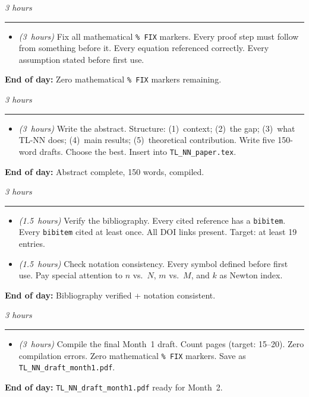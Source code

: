 \documentclass[12pt,a4paper]{article}
\newcommand{\hrs}[1]{\textit{\color{darkgray}(#1~hours)}}
\newcommand{\dayheading}[2]{%
  \vspace{0.3em}
  \noindent{\bfseries\color{darkblue}Day~#1}%
  \hfill{\small\color{darkgray}\textit{#2}}%
  \\[-0.4em]{\color{midgray}\rule{\linewidth}{0.4pt}}%
  \vspace{0.1em}
}
\begin{document}
\begin{tcolorbox}[daystyle]
\dayheading{25}{3 hours}
\begin{itemize}[leftmargin=1.8em,itemsep=3pt]
  \item[\color{midblue}$\bullet$]
    \hrs{3} Fix all mathematical \texttt{\%~FIX} markers.
    Every proof step must follow from something before it.
    Every equation referenced correctly.
    Every assumption stated before first use.
\end{itemize}
\noindent\textbf{End of day:}
Zero mathematical \texttt{\%~FIX} markers remaining.
\end{tcolorbox}

\begin{tcolorbox}[daystyle]
\dayheading{26}{3 hours}
\begin{itemize}[leftmargin=1.8em,itemsep=3pt]
  \item[\color{midblue}$\bullet$]
    \hrs{3} Write the abstract. Structure: (1)~context;
    (2)~the gap; (3)~what TL-NN does; (4)~main results;
    (5)~theoretical contribution. Write five 150-word
    drafts. Choose the best. Insert into
    \texttt{TL\_NN\_paper.tex}.
\end{itemize}
\noindent\textbf{End of day:}
Abstract complete, 150 words, compiled.
\end{tcolorbox}

\begin{tcolorbox}[daystyle]
\dayheading{27}{3 hours}
\begin{itemize}[leftmargin=1.8em,itemsep=3pt]
  \item[\color{midblue}$\bullet$]
    \hrs{1.5} Verify the bibliography. Every cited reference
    has a \texttt{bibitem}. Every \texttt{bibitem} cited
    at least once. All DOI links present.
    Target: at least 19 entries.
  \item[\color{midblue}$\bullet$]
    \hrs{1.5} Check notation consistency. Every symbol
    defined before first use. Pay special attention to
    $n$ vs.\ $N$, $m$ vs.\ $M$, and $k$ as Newton index.
\end{itemize}
\noindent\textbf{End of day:}
Bibliography verified + notation consistent.
\end{tcolorbox}

\begin{tcolorbox}[daystyle]
\dayheading{28}{3 hours}
\begin{itemize}[leftmargin=1.8em,itemsep=3pt]
  \item[\color{midblue}$\bullet$]
    \hrs{3} Compile the final Month~1 draft. Count pages
    (target: 15--20). Zero compilation errors. Zero
    mathematical \texttt{\%~FIX} markers. Save as
    \texttt{TL\_NN\_draft\_month1.pdf}.
\end{itemize}
\noindent\textbf{End of day:}
\texttt{TL\_NN\_draft\_month1.pdf} ready for Month~2.
\end{tcolorbox}
\end{document}
